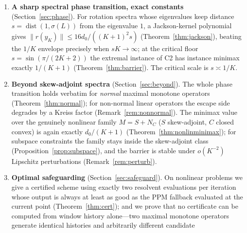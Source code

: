 \documentclass[11pt]{article}
\theoremstyle{definition}
\theoremstyle{remark}
\DeclareMathOperator{\dist}{dist}
\newcommand{\norm}[1]{\| #1 \|}
\begin{document}
\begin{enumerate}[label=\textbf{C\arabic*.},leftmargin=3.2em]
\begin{equation}
      \norm{r(\hat y_K)}\le \frac{d_0}{K+1},
      \end{equation}
      for \emph{every} maximal monotone $M$ (Theorem~\ref{thm:avref}), and
      the natural roots-of-unity rotation instance gives the exact
      instance minimax $1/\Lambda_K$,
      $\Lambda_K=\sum_{j=1}^{K+1}\csc\frac{\pi j}{K+2}
      =(\frac2\pi+o(1))K\log K$ (Theorem~\ref{thm:mainlb}, via the exact
      identity $\ell_j(1)=-\omega^j$ of Lemma~\ref{lem:lagrange}). The
      logarithm is not intrinsic: the $\csc$ mass profile is subcritical,
      while the extremal $\csc^2$ profile concentrates
      $\to 8/\pi^2$ of the mass at the two nodes nearest $u=1$
      (Remark~\ref{rem:artifact}).
\item \textbf{A sharp spectral phase transition, exact constants}
      (Section~\ref{sec:phase}). For rotation spectra whose eigenvalues
      keep distance $s=\dist(1,\sigma(L))$ from the eigenvalue $1$, a
      Jackson-kernel polynomial gives $\norm{r(y_K)}\le 16d_0/((K+1)^2 s)$
      (Theorem~\ref{thm:jackson}), beating the $1/K$ envelope precisely
      when $sK\to\infty$; at the critical floor
      $s=\sin(\pi/(2K+2))$ the extremal instance of C2 has instance
      minimax exactly $1/(K+1)$ (Theorem~\ref{thm:barrier}). The critical
      scale is $s\asymp 1/K$.
\item \textbf{Beyond skew-adjoint spectra} (Section~\ref{sec:beyond}).
      The whole phase transition holds verbatim for \emph{normal} maximal
      monotone operators (Theorem~\ref{thm:normal}); for non-normal
      linear operators the escape side degrades by a Kreiss factor
      (Remark~\ref{rem:nonnormal}). The minimax value over the genuinely
      nonlinear family $M=S+N_C$ ($S$ skew-adjoint, $C$ closed convex) is
      again exactly $d_0/(K+1)$ (Theorem~\ref{thm:nonlinminimax}); for
      subspace constraints the family stays inside the skew-adjoint class
      (Proposition~\ref{prop:subspace}), and the barrier is stable under
      $o(K^{-2})$ Lipschitz perturbations (Remark~\ref{rem:perturb}).
\item \textbf{Optimal safeguarding} (Section~\ref{sec:safeguard}). On
      nonlinear problems we give a certified scheme using exactly two
      resolvent evaluations per iteration whose output is always at least as
      good as the PPM fallback evaluated at the current point
      (Theorem~\ref{thm:cert}); and we prove that no certificate can be
      computed from window history alone---two maximal monotone operators
      generate identical histories and arbitrarily different candidate

\end{enumerate}
\end{document}
